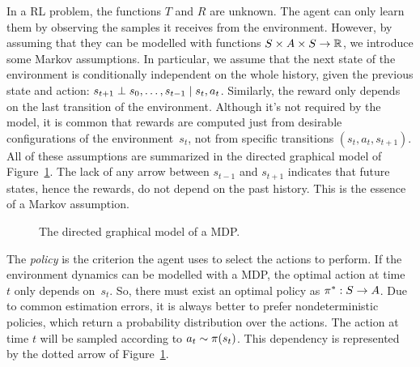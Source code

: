 In a RL problem, the functions $T$ and $R$ are unknown. The agent can only
learn them by observing the samples it receives from the environment.
However, by assuming that they can be modelled with functions ${S \times A
\times S \to \mathbb{R}}$, we introduce some Markov assumptions. In particular, we
assume that the next state of the environment is conditionally independent on
the whole history, given the previous state and action: $s_{t+1} \perp
s_{0}, \dots, s_{t-1} \mid s_{t}, a_{t}$. Similarly,
the reward only depends on the last transition of the environment.  Although
it's not required by the model, it is common that rewards are computed just
from desirable configurations of the environment~$s_{t}$, not from
specific transitions $(s_{t}, a_{t}, s_{t+1})$. All of these
assumptions are summarized in the directed graphical model of
Figure~\ref{fig:mdp}. The lack of any arrow between $s_{t-1}$ and
$s_{t+1}$ indicates that future states, hence the rewards, do not depend
on the past history. This is the essence of a Markov assumption.

\begin{figure}
	\centering
	\caption{The directed graphical model of a MDP.}
	\label{fig:mdp}
\end{figure}

The \emph{policy} is the criterion the agent uses to select the actions to
perform. If the environment dynamics can be modelled with a MDP, the
optimal action at time~$t$ only depends on~$s_{t}$. So, there must exist
an optimal policy as $\pi^*: S \to A$. Due to common estimation errors, it
is always better to prefer nondeterministic policies, which return a
probability distribution over the actions. The action at time $t$ will be
sampled according to $a_t \sim \pi(s_t)$. This dependency is represented
by the dotted arrow of Figure~\ref{fig:mdp}.


